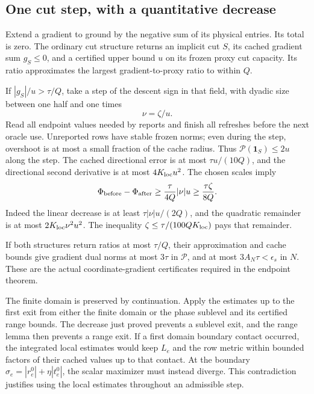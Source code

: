 \documentclass[11pt]{article}
\theoremstyle{definition}\newtheorem{definition}[theorem]{Definition}
\theoremstyle{remark}\newtheorem{remark}[theorem]{Remark}
\newcommand{\one}{\mathbf1}
\begin{document}
\subsection{One cut step, with a quantitative decrease}

Extend a gradient to ground by the negative sum of its physical entries.
Its total is zero. The ordinary cut structure returns an implicit cut
$S$, its cached gradient sum $g_S\le0$, and a certified upper bound $u$
on its frozen proxy cut capacity. Its ratio approximates the largest
gradient-to-proxy ratio to within $Q$.

If $|g_S|/u>\tau/Q$, take a step of the descent sign in that field,
with dyadic size between one half and one times
\begin{equation}\label{eq:normalized-step}
 \nu=\zeta/u.
\end{equation}
Read all endpoint values needed by reports and finish all refreshes
before the next oracle use. Unreported rows have stable frozen norms;
even during the step, overshoot is at most a small fraction of the cache
radius. Thus $\mathcal P(\one_S)\le2u$ along the step.
The cached directional error is at most $\tau u/(10Q)$, and the
directional second derivative is at most $4K_{\rm loc}u^2$.
The chosen scales imply
\begin{equation}\label{eq:decrease}
 \Phi_{\rm before}-\Phi_{\rm after}
 \ge \frac{\tau}{4Q}|\nu|u
 \ge\frac{\tau\zeta}{8Q}.
\end{equation}
Indeed the linear decrease is at least $\tau|\nu|u/(2Q)$, and the
quadratic remainder is at most $2K_{\rm loc}\nu^2u^2$.
The inequality $\zeta\le\tau/(100QK_{\rm loc})$ pays that remainder.

If both structures return ratios at most $\tau/Q$, their approximation
and cache bounds give gradient dual norms at most $3\tau$ in
$\mathcal P$, and at most $3A_N\tau<\epsilon_s$ in $N$.
These are the actual coordinate-gradient certificates required in the
endpoint theorem.

The finite domain is preserved by continuation. Apply the estimates up
to the first exit from either the finite domain or the phase sublevel
and its certified range bounds. The decrease just proved prevents a
sublevel exit, and the range lemma then prevents a range exit. If a
first domain boundary contact occurred, the integrated local estimates
would keep $L_e$ and
the row metric within bounded factors of their cached values up to
that contact. At the boundary $\sigma_e=|r_e^0|+\eta|t_e^0|$, the
scalar maximizer must instead diverge. This contradiction justifies
using the local estimates throughout an admissible step.
\end{document}
